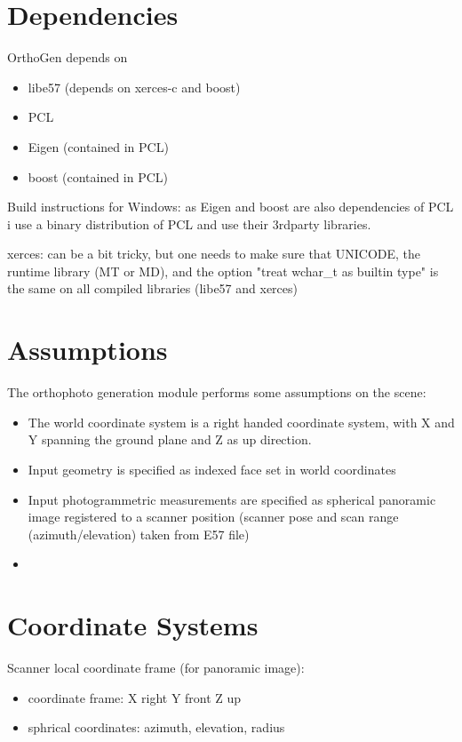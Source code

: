 \documentclass[11pt]{scrartcl}
\begin{document}
\section{Dependencies}

OrthoGen depends on

\begin{itemize}
  \item libe57 (depends on xerces-c and boost)
  \item PCL
  \item Eigen (contained in PCL)
  \item boost (contained in PCL)
\end{itemize}
 
Build instructions for Windows: 
as Eigen and boost are also dependencies of PCL i use a binary
distribution of PCL and use their 3rdparty libraries.

xerces: can be a bit tricky, but one needs to make sure that UNICODE, the runtime library (MT or MD), and the option "treat wchar\_t as builtin type" is the same on all compiled libraries (libe57 and xerces)

 
\section{Assumptions}

The orthophoto generation module performs some assumptions on the scene:

\begin{itemize}
	\item The world coordinate system is a right handed coordinate system, with X and Y spanning the ground plane and Z as up direction.
	\item Input geometry is specified as indexed face set in world coordinates
	\item Input photogrammetric measurements are specified as spherical panoramic image registered to a scanner position 
	(scanner pose and scan range (azimuth/elevation) taken from E57 file)
	\item 
\end{itemize}


\section{Coordinate Systems}

Scanner local coordinate frame (for panoramic image):
\begin{itemize}
  \item coordinate frame: X right Y front Z up
  \item sphrical coordinates: azimuth, elevation, radius
\end{itemize}

 
\end{document}
